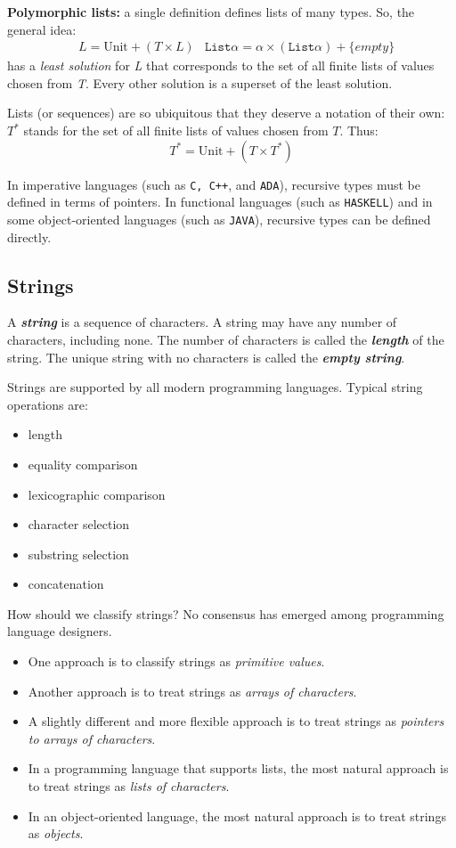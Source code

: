 \documentclass{article}
\begin{document}
\textbf{Polymorphic lists:} a single definition defines lists of many types. So, the general idea:
\begin{align}
    &L = \text{Unit} + (T \times L) &\texttt{List} \alpha = \alpha \times (\texttt{List} \alpha) + \{\textit{empty}\}
\end{align}
has a \textit{least solution} for \textit{L} that corresponds to the set of all finite lists of values chosen from \textit{T}. Every other solution is a superset of the least solution.

Lists (or sequences) are so ubiquitous that they deserve a notation of their
own: $T^*$ stands for the set of all finite lists of values chosen from $T$. Thus:
\begin{equation}
    T^* = \text{Unit} + (T \times T^*)
\end{equation}

In imperative languages (such as \texttt{C, C++}, and \texttt{ADA}), recursive types must be defined in terms of pointers. In functional languages (such as \texttt{HASKELL}) and in some object-oriented languages (such as \texttt{JAVA}), recursive types can be defined directly.

\subsection{Strings}

A \textbf{\textit{string}} is a sequence of characters. A string may have any number of characters, including none. The number of characters is called the \textbf{\textit{length}} of the string. The unique string with no characters is called the \textbf{\textit{empty string}}.

Strings are supported by all modern programming languages. Typical string operations are:
\begin{itemize}
    \item length
    \item equality comparison
    \item lexicographic comparison
    \item character selection
    \item substring selection
    \item concatenation
\end{itemize}

How should we classify strings? No consensus has emerged among programming language designers. 
\begin{itemize}
    \item One approach is to classify strings as \textit{primitive values}. 
    \item Another approach is to treat strings as \textit{arrays of characters}.
    \item A slightly different and more flexible approach is to treat strings as \textit{pointers to arrays of characters}.
    \item In a programming language that supports lists, the most natural approach is to treat strings as \textit{lists of characters}.
    \item In an object-oriented language, the most natural approach is to treat strings as \textit{objects}.
\end{itemize}
\end{document}
